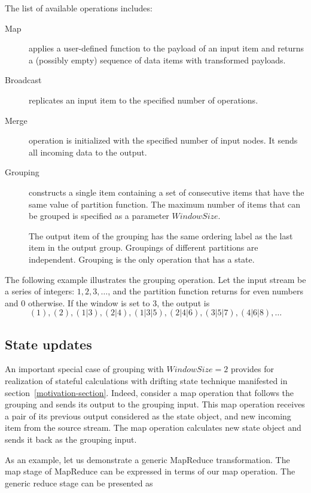 The list of available operations includes:
\begin {description}
  \item [Map] applies a user-defined function to the payload of an input item and returns a (possibly empty) sequence of data items with transformed payloads. 

  \item [Broadcast] replicates an input item to the specified number of operations.

  \item [Merge] operation is initialized with the specified number of input nodes. It sends all incoming data to the output.

  \item [Grouping] constructs a single item containing a set of consecutive items that have the same value of partition function. The maximum number of items that can be grouped is specified as a parameter  $Window Size$. 
    
  The output item of the grouping has the same ordering label as the last item in the output group. Groupings of different partitions are independent. Grouping is the only operation that has a state.
\end {description}

The following example illustrates  the grouping operation. Let the input stream be a series of integers: $ 1,2,3, \ldots$, and the  partition function returns for even numbers and 0 otherwise. If the window is set to 3, the output is 
$$(1), (2), (1|3), (2|4), (1|3|5), (2|4|6), (3|5|7), (4|6|8), \ldots$$


\subsection{State updates}
\label{fs-drifting}

An important special case of grouping with $Window Size = 2$  provides for realization of stateful calculations with drifting state technique manifested in section~\ref{motivation-section}. Indeed, consider a map operation that follows the grouping and sends its output to the grouping input. This map operation receives a pair of its previous output considered as the state object, and new incoming item from the source stream. The map operation calculates new state object and sends it back as the grouping input. 

As an example, let us demonstrate a generic MapReduce transformation. The map stage of MapReduce can be expressed in terms of our map operation. The generic reduce stage can be presented as

